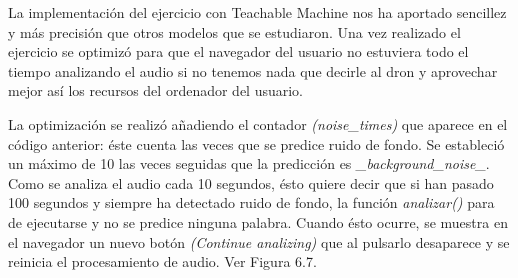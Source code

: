 La implementación del ejercicio con Teachable Machine  nos ha aportado sencillez y más precisión que otros modelos que se estudiaron.
Una vez realizado el ejercicio se optimizó para que el navegador del usuario no estuviera todo el tiempo analizando el  audio si no tenemos nada que decirle al dron y aprovechar mejor así los recursos del ordenador del usuario.

La optimización se realizó añadiendo el contador \textit{(noise\_times)} que aparece en el código anterior: éste cuenta las veces que se predice ruido de fondo. Se estableció un máximo de 10 las veces seguidas que la predicción es \textit{\_background\_noise\_}. Como se analiza el audio cada 10 segundos, ésto quiere decir que si han pasado 100 segundos y siempre ha detectado ruido de fondo, la función \textit{analizar()} para de ejecutarse y no se predice ninguna palabra. Cuando ésto ocurre, se muestra en el navegador un nuevo botón \textit{(Continue analizing)} que al pulsarlo desaparece y se reinicia el procesamiento de audio. Ver Figura 6.7.

